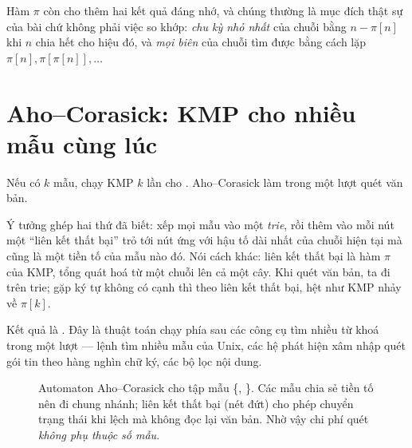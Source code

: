 \documentclass[../../algorithm.tex]{subfiles}
\begin{document}
Hàm \(\pi\) còn cho thêm hai kết quả đáng nhớ, và chúng thường là mục đích thật sự của bài chứ không phải việc so khớp: \emph{chu kỳ nhỏ nhất} của chuỗi bằng \(n - \pi[n]\) khi \(n\) chia hết cho hiệu đó, và \emph{mọi biên} của chuỗi tìm được bằng cách lặp \(\pi[n], \pi[\pi[n]], \dots\)

\section{Aho--Corasick: KMP cho nhiều mẫu cùng lúc}

Nếu có \(k\) mẫu, chạy KMP \(k\) lần cho . Aho--Corasick làm trong một lượt quét văn bản.

Ý tưởng ghép hai thứ đã biết: xếp mọi mẫu vào một \emph{trie}, rồi thêm vào mỗi nút một ``liên kết thất bại'' trỏ tới nút ứng với hậu tố dài nhất của chuỗi hiện tại mà cũng là một tiền tố của mẫu nào đó. Nói cách khác: liên kết thất bại là hàm \(\pi\) của KMP, tổng quát hoá từ một chuỗi lên cả một cây. Khi quét văn bản, ta đi trên trie; gặp ký tự không có cạnh thì theo liên kết thất bại, hệt như KMP nhảy về \(\pi[k]\).

Kết quả là . Đây là thuật toán chạy phía sau các công cụ tìm nhiều từ khoá trong một lượt --- lệnh tìm nhiều mẫu của Unix, các hệ phát hiện xâm nhập quét gói tin theo hàng nghìn chữ ký, các bộ lọc nội dung.

\begin{figure}[H]\centering
{}
\caption{Automaton Aho--Corasick cho tập mẫu \{, \}. Các mẫu chia sẻ tiền tố nên đi chung nhánh; liên kết thất bại (nét đứt) cho phép chuyển trạng thái khi lệch mà không đọc lại văn bản. Nhờ vậy chi phí quét \emph{không phụ thuộc số mẫu}.}
\label{fig:aho}
\end{figure}
\end{document}
